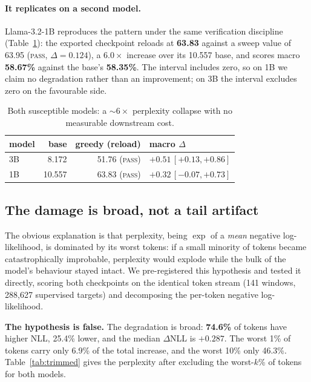 \documentclass[11pt]{article}
\newcommand{\best}[1]{\textbf{#1}}
\begin{document}
\paragraph{It replicates on a second model.} Llama-3.2-1B reproduces the pattern under the same
verification discipline (Table~\ref{tab:replication}): the exported checkpoint reloads at
\best{63.83} against a sweep value of 63.95 (\textsc{pass}, $\Delta = 0.124$), a $6.0\times$
increase over its 10.557 base, and scores macro \best{58.67\%} against the base's \best{58.35\%}.
The interval includes zero, so on 1B we claim no degradation rather than an improvement; on 3B
the interval excludes zero on the favourable side.

\begin{table}[t]
\centering\small\setlength{\tabcolsep}{2.5pt}
\begin{tabular}{lrrl}
\toprule
model & base & greedy (reload) & macro $\Delta$ \\
\midrule
3B & 8.172  & 51.76 \textsc{(pass)} & $+0.51\,[+0.13,+0.86]$ \\
1B & 10.557 & 63.83 \textsc{(pass)} & $+0.32\,[-0.07,+0.73]$ \\
\bottomrule
\end{tabular}
\caption{Both susceptible models: a ${\sim}6\times$ perplexity collapse with no measurable
downstream cost.}
\label{tab:replication}
\end{table}

\subsection{The damage is broad, not a tail artifact}
\label{sec:pertoken}

The obvious explanation is that perplexity, being $\exp$ of a \emph{mean} negative
log-likelihood, is dominated by its worst tokens: if a small minority of tokens became
catastrophically improbable, perplexity would explode while the bulk of the model's behaviour
stayed intact. We pre-registered this hypothesis and tested it directly, scoring both
checkpoints on the identical token stream (141 windows, 288{,}627 supervised targets) and
decomposing the per-token negative log-likelihood.

\textbf{The hypothesis is false.} The degradation is broad: \best{74.6\%} of tokens have higher
NLL, 25.4\% lower, and the median $\Delta$NLL is \best{$+0.287$}. The worst 1\% of tokens carry
only 6.9\% of the total increase, and the worst 10\% only 46.3\%.
Table~\ref{tab:trimmed} gives the perplexity after excluding the worst-$k$\% of tokens for both
models.
\end{document}
